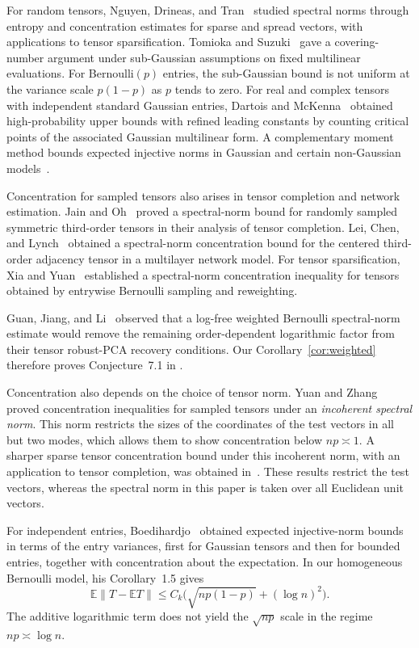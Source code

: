 \documentclass[11pt,reqno]{amsart}
\numberwithin{equation}{section}
\theoremstyle{definition}
\theoremstyle{remark}
\newcommand{\E}{\mathbb E}
\begin{document}
For random tensors, Nguyen, Drineas, and Tran~\cite{NDT15} studied spectral
norms through entropy and concentration estimates for sparse and spread
vectors, with applications to tensor sparsification.
Tomioka and Suzuki~\cite{TS14} gave a covering-number argument under
sub-Gaussian assumptions on fixed multilinear evaluations.
For Bernoulli$(p)$ entries, the sub-Gaussian bound is not uniform at
the variance scale $p(1-p)$ as $p$ tends to zero.
For real and complex tensors with independent standard Gaussian
entries, Dartois and McKenna~\cite{DM24} obtained
high-probability upper bounds with refined leading constants by
counting critical points of the associated Gaussian multilinear form.
A complementary moment method bounds expected injective norms in
Gaussian and certain non-Gaussian models~\cite{DM26}.

Concentration for sampled tensors also arises in tensor completion
and network estimation. Jain and Oh~\cite{JO14}
proved a spectral-norm bound for randomly sampled symmetric
third-order tensors in their analysis of tensor completion.
Lei, Chen, and Lynch~\cite{LCL20} obtained a spectral-norm
concentration bound for the centered third-order adjacency tensor
in a multilayer network model.
For tensor sparsification, Xia and Yuan~\cite{XY21}
established a spectral-norm concentration inequality for tensors
obtained by entrywise Bernoulli sampling and reweighting.


Guan, Jiang, and Li~\cite{GJL25} observed that a log-free weighted Bernoulli
spectral-norm estimate would remove the remaining order-dependent
logarithmic factor from their tensor robust-PCA recovery conditions.
Our Corollary~\ref{cor:weighted}  therefore
proves Conjecture~7.1 in \cite{GJL25}.

Concentration also depends on the choice of tensor norm.
Yuan and Zhang~\cite{YZ17} proved concentration
inequalities for sampled tensors under an \emph{incoherent spectral
norm}. This norm restricts the sizes of the coordinates of the test
vectors in all but two modes, which allows them to show concentration below $np\asymp 1$.
A sharper sparse tensor concentration bound under this incoherent
norm, with an application to tensor completion, was obtained in~\cite{LMSZ26}.
These results restrict the test vectors, whereas the spectral norm
in this paper is taken over all Euclidean unit vectors.

For independent entries, Boedihardjo~\cite{Boe24} obtained
expected injective-norm bounds in terms of the entry variances,
first for Gaussian tensors and then for bounded entries, together
with concentration about the expectation.
In our homogeneous Bernoulli model, his Corollary~1.5 gives
\[
 \E\|T-\E T\|
 \le C_k\bigl(\sqrt{np(1-p)}+(\log n)^2\bigr).
\]
The additive logarithmic term does not yield the $\sqrt{np}$ scale
in the regime $np\asymp \log n$.
\end{document}
